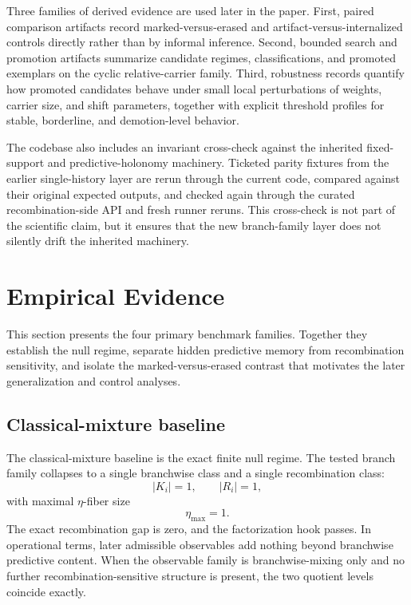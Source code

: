 \documentclass[11pt]{article}
\theoremstyle{definition}
\begin{document}
Three families of derived evidence are used later in the paper. First, paired comparison artifacts record marked-versus-erased and artifact-versus-internalized controls directly rather than by informal inference. Second, bounded search and promotion artifacts summarize candidate regimes, classifications, and promoted exemplars on the cyclic relative-carrier family. Third, robustness records quantify how promoted candidates behave under small local perturbations of weights, carrier size, and shift parameters, together with explicit threshold profiles for stable, borderline, and demotion-level behavior.

The codebase also includes an invariant cross-check against the inherited fixed-support and predictive-holonomy machinery. Ticketed parity fixtures from the earlier single-history layer are rerun through the current code, compared against their original expected outputs, and checked again through the curated recombination-side API and fresh runner reruns. This cross-check is not part of the scientific claim, but it ensures that the new branch-family layer does not silently drift the inherited machinery.

\section{Empirical Evidence}

This section presents the four primary benchmark families. Together they establish the null regime, separate hidden predictive memory from recombination sensitivity, and isolate the marked-versus-erased contrast that motivates the later generalization and control analyses.

\subsection{Classical-mixture baseline}

The classical-mixture baseline is the exact finite null regime. The tested branch family collapses to a single branchwise class and a single recombination class:
\[
|K_i| = 1, \qquad |R_i| = 1,
\]
with maximal \(\eta\)-fiber size
\[
\eta_{\max} = 1.
\]
The exact recombination gap is zero, and the factorization hook passes. In operational terms, later admissible observables add nothing beyond branchwise predictive content. When the observable family is branchwise-mixing only and no further recombination-sensitive structure is present, the two quotient levels coincide exactly.
\end{document}
